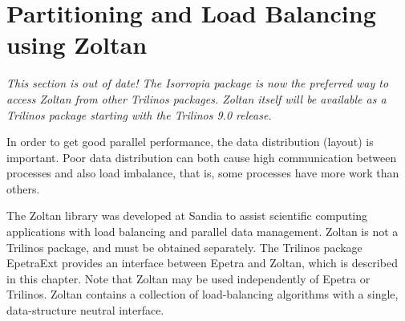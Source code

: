 % 
% 
% 
%  
%  
% 

\chapter{Partitioning and Load Balancing using Zoltan}
\label{chap:zoltan}


\begin{introchapter}
\emph{This section is out of date! The Isorropia package is now the preferred way to access Zoltan from other Trilinos packages. Zoltan itself will be available as a Trilinos package starting with the Trilinos 9.0 release.} 
 
In order to get good parallel performance, the data 
distribution (layout) is important. Poor data distribution can both
cause high communication between processes and also load imbalance,
that is, some processes have more work than others. 

The Zoltan library \cite{zoltan2002,ZoltanUG} was developed at Sandia to assist
scientific computing applications with load balancing and parallel
data management. Zoltan is not a Trilinos package, and must be
obtained separately. The Trilinos package EpetraExt provides
an interface between Epetra and Zoltan, which is described in
this chapter. Note that Zoltan may be used independently of Epetra
or Trilinos. Zoltan contains a collection of load-balancing algorithms 
with a single, data-structure neutral interface.
\end{introchapter}

